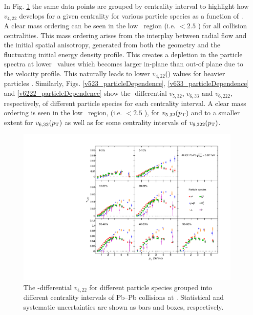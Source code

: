 \newpage

In Fig. \ref{v422_particleDependence} the same data points are grouped by centrality interval to highlight how $v_{4,22}$ develops for a given centrality for various particle species as a function of \pT.
A clear mass ordering can be seen in the low \pT~region (i.e. \pT $< 2.5$ \GeV) for all collision centralities. This mass ordering arises from the interplay between radial flow and the initial spatial anisotropy, generated from both the geometry and the fluctuating initial energy density profile. This creates a depletion in the particle spectra at lower \pT~values which becomes larger in-plane than out-of plane due to the velocity profile. This naturally leads to lower $v_{4,22}$(\pT) values for heavier particles \cite{Voloshin:1996nv, Huovinen:2001cy, Shen:2011eg}. Similarly, Figs. \ref{v523_particleDependence}, \ref{v633_particleDependence} and \ref{v6222_particleDependence} show the \pT-differential $v_{5,32}$, $v_{6,33}$ and $v_{6,222}$, respectively, of different particle species for each centrality interval. A clear mass ordering is seen in the low \pT~region, (i.e. \pT $< 2.5$ \GeV), for $v_{5,32}(p_{\rm{T}})$ and to a smaller extent for $v_{6,33}(p_{\rm{T}})$ as well as for some centrality intervals of $v_{6,222}(p_{\rm{T}})$.

\begin{figure}[!htb]
\begin{center}
\includegraphics[scale=0.82]{figures/results/All_v422_gap00_PID2_3by3.pdf}
\end{center}
\caption{The \pT-differential $v_{4,22}$ for different particle species grouped into different centrality intervals of Pb--Pb collisions at \sNN. Statistical and systematic uncertainties are shown as bars and boxes, respectively.}
\label{v422_particleDependence}
\end{figure}


